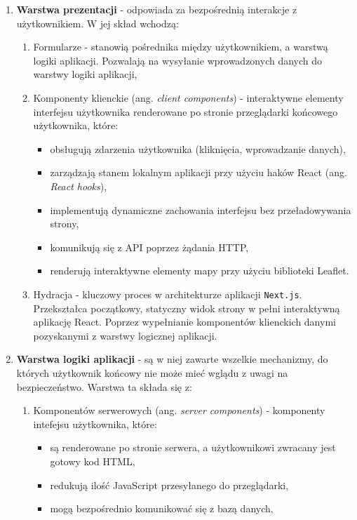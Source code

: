 \begin{enumerate}
    \item \textbf{Warstwa prezentacji} - odpowiada za bezpośrednią interakcje z użytkownikiem. W jej skład wchodzą:
    \begin{enumerate}
        \item Formularze - stanowią pośrednika między użytkownikiem, a warstwą logiki aplikacji. Pozwalają na wysyłanie wprowadzonych danych do warstwy logiki aplikacji,
        \item Komponenty klienckie (ang. \emph{client components}) - interaktywne elementy interfejsu użytkownika renderowane po stronie przeglądarki końcowego użytkownika, które:
        \begin{itemize}
            \item obsługują zdarzenia użytkownika (kliknięcia, wprowadzanie danych),
            \item zarządzają stanem lokalnym aplikacji przy użyciu haków React (ang. \emph{React hooks}),
            \item implementują dynamiczne zachowania interfejsu bez przeładowywania strony,
            \item komunikują się z API poprzez żądania HTTP,
            \item renderują interaktywne elementy mapy przy użyciu biblioteki Leaflet.
        \end{itemize}
        \item Hydracja - kluczowy proces w architekturze aplikacji \texttt{Next.js}. Przekształca początkowy, statyczny widok strony w pełni interaktywną aplikację React. Poprzez wypełnianie komponentów klienckich danymi pozyskanymi z warstwy logicznej aplikacji.
    \end{enumerate}
    \item \textbf{Warstwa logiki aplikacji} - są w niej zawarte wszelkie mechanizmy, do których użytkownik końcowy nie może mieć wglądu z uwagi na bezpieczeństwo. Warstwa ta składa się z:
    \begin{enumerate}
        \item Komponentów serwerowych (ang. \emph{server components}) - komponenty intefejsu użytkownika, które:
        \begin{itemize}
            \item są renderowane po stronie serwera, a użytkownikowi zwracany jest gotowy kod HTML,
            \item redukują ilość JavaScript przesyłanego do przeglądarki,
            \item mogą bezpośrednio komunikować się z bazą danych,

\end{itemize}
\end{enumerate}
\end{enumerate}
